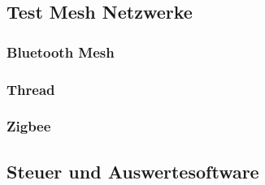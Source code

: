 \subsection{Test Mesh Netzwerke}\label{subsec:TestMeshNetzwerke}

\subsubsection{Bluetooth Mesh}\label{subsubsection:Bluetooth Mesh}

\subsubsection{Thread}\label{subsubsection:Thread} 

\subsubsection{Zigbee}\label{subsubsection:Zigbee}


\subsection{Steuer und Auswertesoftware}\label{subsec:SteuerundAuswertesoftware}

